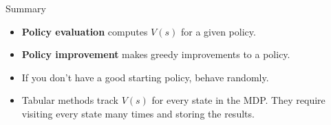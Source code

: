 \documentclass[9pt]{beamer}
\newcommand\lspace{\addtolength{\itemsep}{0.5\baselineskip}}
\begin{document}
\begin{frame}{Summary}

\begin{itemize}\lspace
	\item \textbf{Policy evaluation} computes $V(s)$ for a given policy.
	\item \textbf{Policy improvement} makes greedy improvements to a policy.
	\item If you don't have a good starting policy, behave randomly.
	\item Tabular methods track $V(s)$ for every state in the MDP. They require visiting every state many times and storing the results.
\end{itemize}

\end{frame}
\end{document}

